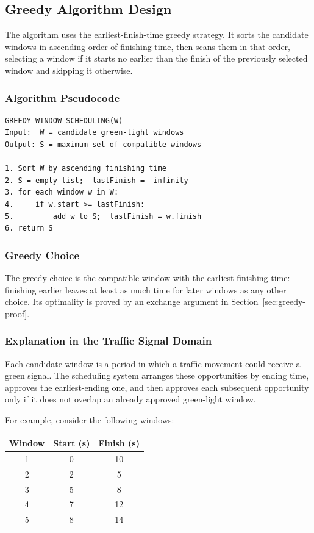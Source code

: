 \subsection{Greedy Algorithm Design}

The algorithm uses the earliest-finish-time greedy
strategy. It sorts the candidate windows in ascending
order of finishing time, then scans them in that order,
selecting a window if it starts no earlier than the
finish of the previously selected window and skipping
it otherwise.

\subsubsection{Algorithm Pseudocode}

\begin{verbatim}
GREEDY-WINDOW-SCHEDULING(W)
Input:  W = candidate green-light windows
Output: S = maximum set of compatible windows

1. Sort W by ascending finishing time
2. S = empty list;  lastFinish = -infinity
3. for each window w in W:
4.     if w.start >= lastFinish:
5.         add w to S;  lastFinish = w.finish
6. return S
\end{verbatim}

\subsubsection{Greedy Choice}

The greedy choice is the compatible window with the
earliest finishing time: finishing earlier leaves at
least as much time for later windows as any other
choice. Its optimality is proved by an exchange
argument in Section~\ref{sec:greedy-proof}.

\subsubsection{Explanation in the Traffic Signal Domain}

Each candidate window is a period in which a traffic
movement could receive a green signal. The scheduling
system arranges these opportunities by ending time,
approves the earliest-ending one, and then approves
each subsequent opportunity only if it does not overlap
an already approved green-light window.

For example, consider the following windows:

\begin{center}
\begin{tabular}{|c|c|c|}
\hline
Window & Start (s) & Finish (s) \\
\hline
1 & 0 & 10 \\
2 & 2 & 5 \\
3 & 5 & 8 \\
4 & 7 & 12 \\
5 & 8 & 14 \\
\hline
\end{tabular}
\end{center}

